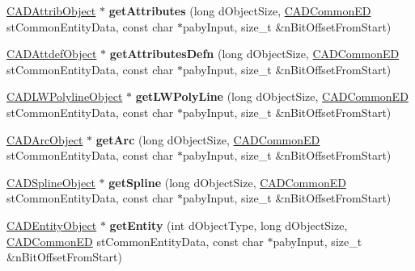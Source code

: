 \begin{DoxyCompactItemize}
\item 
\hyperlink{class_c_a_d_attrib_object}{C\+A\+D\+Attrib\+Object} $\ast$ {\bfseries get\+Attributes} (long d\+Object\+Size, \hyperlink{struct_c_a_d_common_e_d}{C\+A\+D\+Common\+ED} st\+Common\+Entity\+Data, const char $\ast$paby\+Input, size\+\_\+t \&n\+Bit\+Offset\+From\+Start)\hypertarget{class_d_w_g_file_r2000_a2c0165a86e2b76cdb4dc745c91f92857}{}\label{class_d_w_g_file_r2000_a2c0165a86e2b76cdb4dc745c91f92857}

\item 
\hyperlink{class_c_a_d_attdef_object}{C\+A\+D\+Attdef\+Object} $\ast$ {\bfseries get\+Attributes\+Defn} (long d\+Object\+Size, \hyperlink{struct_c_a_d_common_e_d}{C\+A\+D\+Common\+ED} st\+Common\+Entity\+Data, const char $\ast$paby\+Input, size\+\_\+t \&n\+Bit\+Offset\+From\+Start)\hypertarget{class_d_w_g_file_r2000_af886333636e1fb3785cda4f4d279bc9b}{}\label{class_d_w_g_file_r2000_af886333636e1fb3785cda4f4d279bc9b}

\item 
\hyperlink{class_c_a_d_l_w_polyline_object}{C\+A\+D\+L\+W\+Polyline\+Object} $\ast$ {\bfseries get\+L\+W\+Poly\+Line} (long d\+Object\+Size, \hyperlink{struct_c_a_d_common_e_d}{C\+A\+D\+Common\+ED} st\+Common\+Entity\+Data, const char $\ast$paby\+Input, size\+\_\+t \&n\+Bit\+Offset\+From\+Start)\hypertarget{class_d_w_g_file_r2000_ad66d0d3fbd417bcffd2916d7a4183bdd}{}\label{class_d_w_g_file_r2000_ad66d0d3fbd417bcffd2916d7a4183bdd}

\item 
\hyperlink{class_c_a_d_arc_object}{C\+A\+D\+Arc\+Object} $\ast$ {\bfseries get\+Arc} (long d\+Object\+Size, \hyperlink{struct_c_a_d_common_e_d}{C\+A\+D\+Common\+ED} st\+Common\+Entity\+Data, const char $\ast$paby\+Input, size\+\_\+t \&n\+Bit\+Offset\+From\+Start)\hypertarget{class_d_w_g_file_r2000_abfedb12aa1e14d339ae2a05d83d783b6}{}\label{class_d_w_g_file_r2000_abfedb12aa1e14d339ae2a05d83d783b6}

\item 
\hyperlink{class_c_a_d_spline_object}{C\+A\+D\+Spline\+Object} $\ast$ {\bfseries get\+Spline} (long d\+Object\+Size, \hyperlink{struct_c_a_d_common_e_d}{C\+A\+D\+Common\+ED} st\+Common\+Entity\+Data, const char $\ast$paby\+Input, size\+\_\+t \&n\+Bit\+Offset\+From\+Start)\hypertarget{class_d_w_g_file_r2000_a6e3c76f201b920135baf6726ff7fea39}{}\label{class_d_w_g_file_r2000_a6e3c76f201b920135baf6726ff7fea39}

\item 
\hyperlink{class_c_a_d_entity_object}{C\+A\+D\+Entity\+Object} $\ast$ {\bfseries get\+Entity} (int d\+Object\+Type, long d\+Object\+Size, \hyperlink{struct_c_a_d_common_e_d}{C\+A\+D\+Common\+ED} st\+Common\+Entity\+Data, const char $\ast$paby\+Input, size\+\_\+t \&n\+Bit\+Offset\+From\+Start)\hypertarget{class_d_w_g_file_r2000_ae8cad516a5ff7bd4a65bf25ebdf48c75}{}\label{class_d_w_g_file_r2000_ae8cad516a5ff7bd4a65bf25ebdf48c75}


\end{DoxyCompactItemize}
